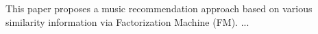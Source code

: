 \begin{abstractEN}

This paper proposes a music recommendation approach based on various similarity
information via Factorization Machine (FM).  ...

\end{abstractEN}

\begin{comment}


\category{I.m}{Computing Methodologies}{Miscellaneous}

\terms{Similarity, Emotional Text.}

\keywords{Factorization Machine, Collaborative Filtering, Recommender System, Music Recommendations.}

\end{comment}

